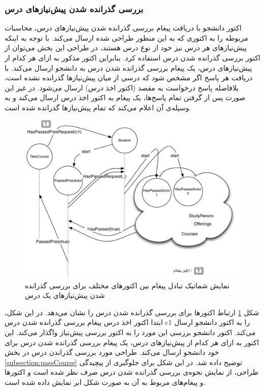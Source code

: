 \subsubsection{بررسی گذرانده شدن پیش‌نیازهای درس}
اکتور دانشجو با دریافت پیغام بررسی گذرانده شدن پیش‌نیازهای درس، محاسبات مربوطه را به اکتوری که به این منظور طراحی شده ارسال می‌کند. با توجه به اینکه پیش‌نیازهای هر درس نیز خود از نوع درس هستند، در طراحی این بخش می‌توان از اکتور بررسی گذرانده شدن درس استفاده کرد. بنابراین اکتور مذکور به ازای هر کدام از پیش‌نیازهای درس، یک پیغام بررسی گذرانده شدن درس به دانشجو ارسال می‌کند. با دریافت هر پاسخ اگر مشخص شود که درسی از میان پیش‌نیازها گذرانده نشده است، بلافاصله پاسخ درخواست به مقصد (اکتور اخذ درس) ارسال می‌شود. در غیر این صورت پس از گرفتن تمام پاسخ‌ها، یک پیغام به اکتور اخذ درس ارسال می‌کند و به وسیله‌ی آن اعلام می‌کند که تمام پیش‌نیازها گذرانده شده است.
\begin{figure}[ht]
    \begin{center}
	\includegraphics[width=14cm]{4-ProposedFramework/Figures/Prerequisites.pdf}
    \end{center}
    \caption{\label{fig:take_course_pres}نمایش شماتیک تبادل پیغام بین اکتورهای مختلف برای بررسی گذرانده شدن پیش‌نیازها‌ی یک درس }
\end{figure}
شکل \ref{fig:take_course_pres} ارتباط اکتورها برای بررسی گذرانده شدن درس را نشان می‌دهد. در این شکل، ابتدا اکتور اخذ درس پیغام بررسی گذرانده شدن درس c1 را به اکتور دانشجو ارسال می‌کند. اکتور دانشجو بررسی این مورد را به اکتور بررسی پیش‌نیاز واگذار می‌کند. این اکتور به ازای هر کدام از پیش‌نیاز‌های  درس، یک پیغام بررسی گذرانده شدن درس برای خود دانشجو ارسال می‌کند. طراحی مورد بررسی گذراندن درس در بخش \ref{subsection:passCourse} توضیح داده شد. در این شکل برای جلوگیری از پیچیدگی طراحی، از نمایش نحوه‌ی بررسی گذرانده شدن درس صرف نظر شده است و اکتورها و پیغام‌های مربوط به آن به صورت شکل ابر نمایش داده شده است.

